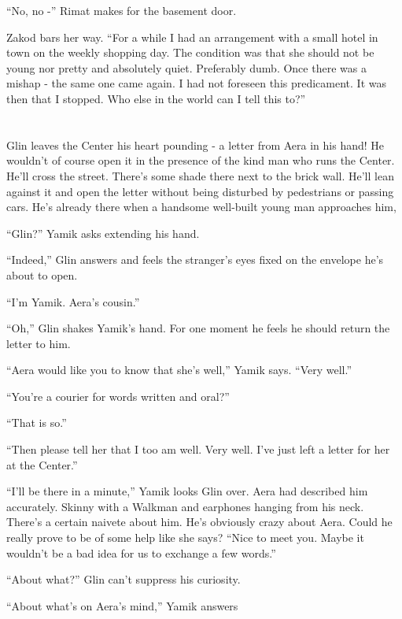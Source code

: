 \documentclass[twoside,11pt]{book}
\begin{document}
``No, no -'' Rimat makes for the basement door.

Zakod bars her way. ``For a while I had an arrangement with a small hotel in town on the weekly shopping
day. The condition was that she should not be young nor pretty and absolutely quiet. Preferably dumb.  Once there was a
mishap - the same one came again. I had not foreseen this predicament. It was then that I stopped. Who else in the
world can I tell this to?''



\chapter{}

Glin leaves the Center his heart pounding - a letter from Aera in his hand! He wouldn't of course open it in the
presence of the kind man who runs the Center. He'll cross the street. There's some shade there next to the brick wall.
He'll lean against it and open the letter without being disturbed by pedestrians or passing cars. He's already there
when a handsome well-built young man approaches him,

``Glin?'' Yamik asks extending his hand.

``Indeed,'' Glin answers and feels the stranger's eyes fixed on the envelope he's about to
open.

``I'm Yamik. Aera's cousin.''

``Oh,'' Glin shakes Yamik's hand. For one moment he feels he should return the letter to him.


``Aera would like you to know that she's well,'' Yamik says. ``Very
well.''

``You're a courier for words written and oral?''

``That is so.''

``Then please tell her that I too am well. Very well.  I've just left a letter for her at the
Center.''

``I'll be there in a minute,'' Yamik looks Glin over. Aera had described him accurately.
Skinny with a Walkman and earphones hanging from his neck. There's a certain naivete about him. He's obviously crazy
about Aera. Could he really prove to be of some help like she says? ``Nice to meet you. Maybe it wouldn't
be a bad idea for us to exchange a few words.''

``About what?'' Glin can't suppress his curiosity.

``About what's on Aera's mind,'' Yamik answers
\end{document}
